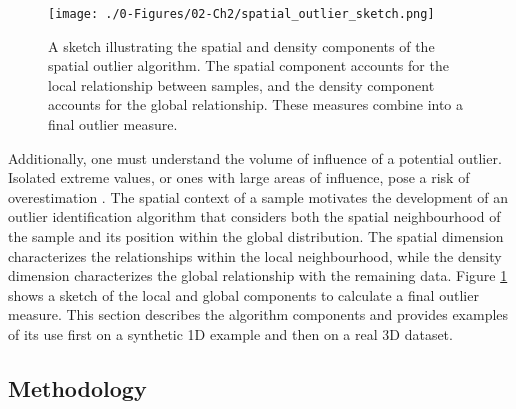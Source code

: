 \begin{figure}[htb!]
    \centering
    \texttt{[image: ./0-Figures/02-Ch2/spatial\_outlier\_sketch.png]}
    \caption{A sketch illustrating the spatial and density components of the spatial outlier algorithm. The spatial component accounts for the local relationship between samples, and the density component accounts for the global relationship. These measures combine into a final outlier measure.}
    \label{fig:spatial_outlier_sketch}
\end{figure}


Additionally, one must understand the volume of influence of a potential outlier. Isolated extreme values, or ones with large areas of influence, pose a risk of overestimation \citep{leuangthong2015dealing}. The spatial context of a sample motivates the development of an outlier identification algorithm that considers both the spatial neighbourhood of the sample and its position within the global distribution. The spatial dimension characterizes the relationships within the local neighbourhood, while the density dimension characterizes the global relationship with the remaining data. Figure \ref{fig:spatial_outlier_sketch} shows a sketch of the local and global components to calculate a final outlier measure. This section describes the algorithm components and provides examples of its use first on a synthetic \gls{1D} example and then on a real \gls{3D} dataset.

\subsection{Methodology}
\label{subsec:02methodology}


